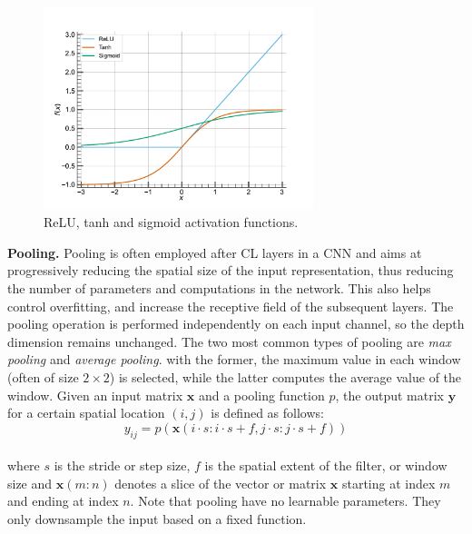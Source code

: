 \begin{figure}[htbp]
  \centering
  \includegraphics[width=0.7\textwidth]{chapter_dlo/assets/activation_functions.pdf}
  \caption{\ac{ReLU}, tanh and sigmoid activation functions.}
  \label{fig:dlo:activation_functions}
\end{figure}

\noindent \textbf{Pooling.} Pooling is often employed after \ac{CL} layers
in a \ac{CNN} and aims at progressively reducing the spatial size of the input
representation, thus reducing the number of parameters and computations in the
network. This also helps control overfitting, and increase the receptive field
of the subsequent layers. The pooling operation is performed independently on
each input channel, so the depth dimension remains unchanged. The two most
common types of pooling are \emph{max pooling} and \emph{average pooling}. with
the former, the maximum value in each window (often of size $2\times 2$) is
selected, while the latter computes the average value of the window. Given an
input matrix $\mathbf{x}$ and a pooling function $p$, the output matrix $
\mathbf{y} $ for a certain spatial location $(i, j)$ is defined as follows:\\

\begin{equation}
  \label{eqn:dlo:pooling}
  y_{ij} = p \left( \mathbf{x}(i⋅s:i⋅s+f,j⋅s:j⋅s+f) \right)
\end{equation}\\

\noindent where $s$ is the stride or step size, $f$ is the spatial extent of the
filter, or window size and $\mathbf{x}(m:n)$ denotes a slice of the vector or
matrix $\mathbf{x}$ starting at index $m$ and ending at index $n$. Note that
pooling have no learnable parameters. They only downsample the input based on a
fixed function.\\


